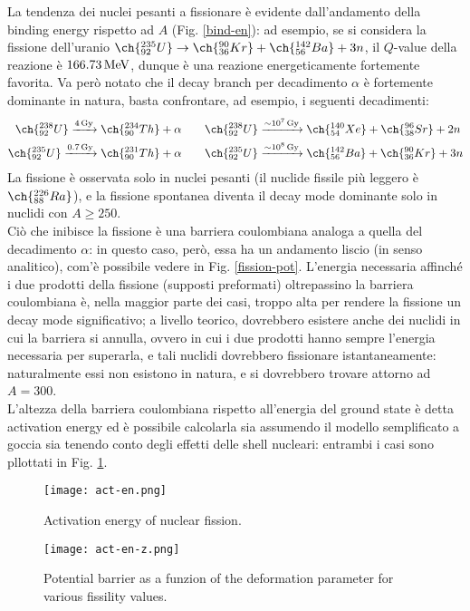 La tendenza dei nuclei pesanti a fissionare è evidente dall'andamento della binding energy rispetto ad $ A $ (Fig. \ref{bind-en}): ad esempio, se si considera la fissione dell'uranio $ \ch{^{235}_{92} U} \rightarrow \ch{^{90}_{36} Kr} + \ch{^{142}_{56} Ba} + 3 n $, il $ Q $-value della reazione è $ 166.73\,\text{MeV} $, dunque è una reazione energeticamente fortemente favorita. Va però notato che il decay branch per decadimento $ \alpha $ è fortemente dominante in natura, basta confrontare, ad esempio, i seguenti decadimenti:
\begin{equation*}
	\begin{split}
		\ch{^{238}_{92} U} \xrightarrow{4\,\text{Gy}} \ch{^{234}_{90} Th} + \alpha &\qquad \ch{^{238}_{92} U} \xrightarrow{\sim 10^7\,\text{Gy}} \ch{^{140}_{54} Xe} + \ch{^{96}_{38} Sr} + 2n\\
		\ch{^{235}_{92} U} \xrightarrow{0.7\,\text{Gy}} \ch{^{231}_{90} Th} + \alpha &\qquad \ch{^{235}_{92} U} \xrightarrow{\sim 10^8\,\text{Gy}} \ch{^{142}_{56} Ba} + \ch{^{90}_{36} Kr} + 3n
	\end{split}
\end{equation*}
La fissione è osservata solo in nuclei pesanti (il nuclide fissile più leggero è $ \ch{^{226}_{88} Ra} $), e la fissione spontanea diventa il decay mode dominante solo in nuclidi con $ A \ge 250 $.\\
Ciò che inibisce la fissione è una barriera coulombiana analoga a quella del decadimento $ \alpha $: in questo caso, però, essa ha un andamento liscio (in senso analitico), com'è possibile vedere in Fig. \ref{fission-pot}. L'energia necessaria affinché i due prodotti della fissione (supposti preformati) oltrepassino la barriera coulombiana è, nella maggior parte dei casi, troppo alta per rendere la fissione un decay mode significativo; a livello teorico, dovrebbero esistere anche dei nuclidi in cui la barriera si annulla, ovvero in cui i due prodotti hanno sempre l'energia necessaria per superarla, e tali nuclidi dovrebbero fissionare istantaneamente: naturalmente essi non esistono in natura, e si dovrebbero trovare attorno ad $ A = 300 $.\\
L'altezza della barriera coulombiana rispetto all'energia del ground state è detta activation energy ed è possibile calcolarla sia assumendo il modello semplificato a goccia sia tenendo conto degli effetti delle shell nucleari: entrambi i casi sono pllottati in Fig. \ref{act-en}.

\begin{figure}
	\centering
	\texttt{[image: act-en.png]}
	\caption{Activation energy of nuclear fission.}
	\label{act-en}
\end{figure}
\begin{figure}
	\centering
	\texttt{[image: act-en-z.png]}
	\caption{Potential barrier as a funzion of the deformation parameter for various fissility values.}
	\label{act-en-z}
\end{figure}


